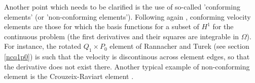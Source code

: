 Another point which needs to be clarified is the use of so-called 'conforming elements' 
(or 'non-conforming elements').  
Following again \cite{grsa}, conforming velocity elements are those for which the basis functions for a subset 
of $H^1$ for the continuous problem (the first derivatives and their squares are integrable in $\Omega$).
For instance, the rotated $Q_1 \times P_0$ element of Rannacher and Turek (see section \ref{ncq1p0}) is such that 
the velocity is discontinous across element edges, so that the derivative does not exist there. Another
typical example of non-conforming element is the Crouzeix-Raviart element \cite{crra73}.

 


